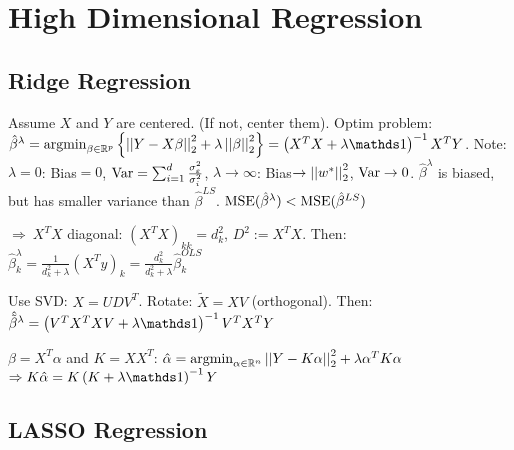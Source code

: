 \section{High Dimensional Regression}

\vspace{-5pt}

\subsection{Ridge Regression}

\vspace{-4pt}

Assume $X$ and $Y$ are centered. (If not, center them). Optim problem:
$\hat{\beta}^\lambda = \argmin_{\beta \in \R^p} \geschwungeneklammer{\Norm{Y - X \beta}_2^2 + \lambda \Norm{\beta}_2^2} = \klammer{X^T X + \lambda \id}^{-1} X^T Y$.
Note: $\lambda = 0$: Bias$=0$, $\text{Var} = \sum_{i=1}^{d} \frac{\sigma_\varepsilon^2}{\sigma_i^2}$, $\lambda \rightarrow \infty$: Bias$\rightarrow \left\vert\left\vert w^* \right\vert\right\vert_2^2$, $\text{Var} \rightarrow 0$.
$\hat{\beta}^\lambda$ is biased, but has smaller variance than $\hat{\beta}^{LS}$. $\text{MSE}(\hat{\beta}^\lambda) < \text{MSE} (\hat{\beta}^{LS})$

\vspace{3pt}

 $\Rightarrow \ X^T X$ diagonal: $(X^T X)_{kk} = d_k^2$, $D^2 := X^T X$. Then: $\hat{\beta}_k^\lambda = \frac{1}{d_k^2 + \lambda} (X^T y)_k = \frac{d_k^2}{d_k^2 + \lambda} \hat{\beta}^{OLS}_k$

\vspace{3pt}

 Use SVD: $X = UDV^T$. Rotate: $\tilde{X} = X V$ (orthogonal). Then: $\hat{\tilde{\beta}}^\lambda = \klammer{V^T X^T X V + \lambda \id}^{-1} V^T X^T Y$

\vspace{3pt}

$\beta = X^T \alpha$ and $K = X X^T$:
$\hat{\alpha} = \text{argmin}_{\alpha \in \mathbb{R}^n} \left\vert\left\vert Y - K \alpha \right\vert\right\vert_2^2 + \lambda \alpha^T K \alpha$
$\Rightarrow K \hat{\alpha} = K \klammer{K + \lambda \id}^{-1} Y$

\vspace{-7pt}

\subsection{LASSO Regression}

